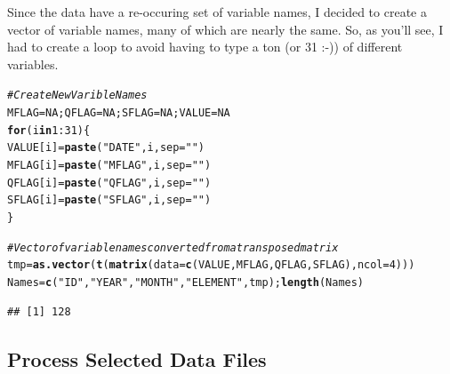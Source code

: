 \documentclass{article}\usepackage[]{graphicx}\usepackage[]{color}
\makeatletter
\newcommand{\hlnum}[1]{\textcolor[rgb]{0.686,0.059,0.569}{#1}}%
\newcommand{\hlstr}[1]{\textcolor[rgb]{0.192,0.494,0.8}{#1}}%
\newcommand{\hlcom}[1]{\textcolor[rgb]{0.678,0.584,0.686}{\textit{#1}}}%
\newcommand{\hlopt}[1]{\textcolor[rgb]{0,0,0}{#1}}%
\newcommand{\hlstd}[1]{\textcolor[rgb]{0.345,0.345,0.345}{#1}}%
\newcommand{\hlkwa}[1]{\textcolor[rgb]{0.161,0.373,0.58}{\textbf{#1}}}%
\newcommand{\hlkwb}[1]{\textcolor[rgb]{0.69,0.353,0.396}{#1}}%
\newcommand{\hlkwc}[1]{\textcolor[rgb]{0.333,0.667,0.333}{#1}}%
\newcommand{\hlkwd}[1]{\textcolor[rgb]{0.737,0.353,0.396}{\textbf{#1}}}%
\newenvironment{kframe}{%
 \def\at@end@of@kframe{}%
 \ifinner\ifhmode%
  \def\at@end@of@kframe{\end{minipage}}%
  \begin{minipage}{\columnwidth}%
 \fi\fi%
 \def\FrameCommand##1{\hskip\@totalleftmargin \hskip-\fboxsep
 \colorbox{shadecolor}{##1}\hskip-\fboxsep
     \hskip-\linewidth \hskip-\@totalleftmargin \hskip\columnwidth}%
 \MakeFramed {\advance\hsize-\width
   \@totalleftmargin\z@ \linewidth\hsize
   \@setminipage}}%
 {\par\unskip\endMakeFramed%
 \at@end@of@kframe}
\newenvironment{knitrout}{}{} %
\makeatother
\begin{document}
Since the data have a re-occuring set of variable names, I decided to create a vector of variable names, many of which are nearly the same. So, as you'll see, I had to create a loop to avoid having to type a ton (or 31 :-)) of different variables.
\begin{knitrout}
\color{fgcolor}\begin{kframe}
\begin{alltt}
\hlcom{# Create New Varible Names}
\hlstd{MFLAG}\hlkwb{=}\hlnum{NA}\hlstd{; QFLAG}\hlkwb{=}\hlnum{NA}\hlstd{; SFLAG}\hlkwb{=}\hlnum{NA}\hlstd{; VALUE}\hlkwb{=}\hlnum{NA}
\hlkwa{for} \hlstd{(i} \hlkwa{in} \hlnum{1}\hlopt{:}\hlnum{31}\hlstd{)\{}
\hlstd{VALUE[i]} \hlkwb{=} \hlkwd{paste}\hlstd{(}\hlstr{"DATE"}\hlstd{, i,} \hlkwc{sep}\hlstd{=}\hlstr{""}\hlstd{)}
\hlstd{MFLAG[i]} \hlkwb{=} \hlkwd{paste}\hlstd{(}\hlstr{"MFLAG"}\hlstd{, i,} \hlkwc{sep}\hlstd{=}\hlstr{""}\hlstd{)}
\hlstd{QFLAG[i]} \hlkwb{=} \hlkwd{paste}\hlstd{(}\hlstr{"QFLAG"}\hlstd{, i,} \hlkwc{sep}\hlstd{=}\hlstr{""}\hlstd{)}
\hlstd{SFLAG[i]} \hlkwb{=} \hlkwd{paste}\hlstd{(}\hlstr{"SFLAG"}\hlstd{, i,} \hlkwc{sep}\hlstd{=}\hlstr{""}\hlstd{)}
\hlstd{\}}

\hlcom{# Vector of variable names converted from a transposed matrix}
\hlstd{tmp} \hlkwb{=} \hlkwd{as.vector}\hlstd{(}\hlkwd{t}\hlstd{(}\hlkwd{matrix}\hlstd{(}\hlkwc{data}\hlstd{=}\hlkwd{c}\hlstd{(VALUE, MFLAG, QFLAG, SFLAG),} \hlkwc{ncol}\hlstd{=}\hlnum{4}\hlstd{)))}
\hlstd{Names} \hlkwb{=} \hlkwd{c}\hlstd{(}\hlstr{"ID"}\hlstd{,} \hlstr{"YEAR"}\hlstd{,} \hlstr{"MONTH"}\hlstd{,} \hlstr{"ELEMENT"}\hlstd{, tmp);} \hlkwd{length}\hlstd{(Names)}
\end{alltt}
\begin{verbatim}
## [1] 128
\end{verbatim}
\end{kframe}
\end{knitrout}

\subsection{Process Selected Data Files}
\end{document}

